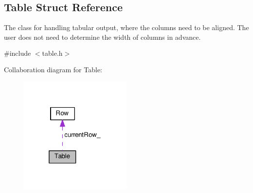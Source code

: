 \hypertarget{structTable}{}\subsection{Table Struct Reference}
\label{structTable}


The class for handling tabular output, where the columns need to be aligned. The user does not need to determine the width of columns in advance.  




{\ttfamily \#include $<$table.\+h$>$}



Collaboration diagram for Table\+:\nopagebreak
\begin{figure}[H]
\begin{center}
\leavevmode
\includegraphics[width=160pt]{structTable__coll__graph}
\end{center}
\end{figure}
